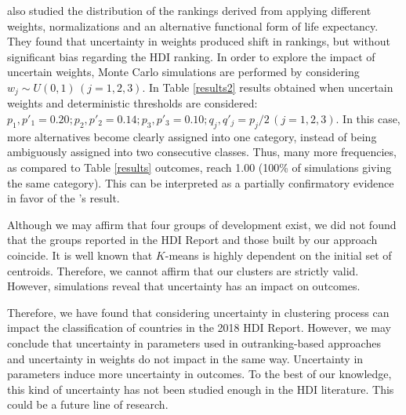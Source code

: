 \documentclass[]{elsarticle}
\theoremstyle{definition}
\begin{document}
\cite{Garcia2010} also studied the distribution of the rankings derived from applying different weights, normalizations and an alternative functional form of life expectancy. They found that uncertainty in weights produced shift in rankings, but without significant bias regarding the HDI ranking.  In order to explore the impact of uncertain weights, Monte Carlo simulations are performed by considering $w_j \sim U(0,1) \, (j=1,2,3)$.  In Table \ref{results2} results obtained when uncertain weights and deterministic thresholds are considered:   $p_1,p'_1 =0.20;  p_2,p'_2 =0.14; p_3,p'_3 = 0.10; q_j,q'_j=p_j/2 \,(j=1,2,3)$.  In this case, more alternatives become clearly assigned into one category, instead of being ambiguously assigned into two consecutive classes. Thus, many more frequencies, as compared to Table \ref{results} outcomes,  reach 1.00 (100\% of simulations giving the same category).   This can be interpreted as a partially confirmatory evidence in favor of the \cite{Garcia2010}'s result.

Although we may affirm that four groups of development exist, we did not found that the groups reported in the HDI Report and those built by our approach coincide. It is well known that $K$-means is highly dependent on the initial set of centroids. Therefore, we cannot affirm that our clusters are strictly valid.  However, simulations reveal that uncertainty has an impact on outcomes. 

Therefore, we have found that considering uncertainty in clustering process can impact the classification of countries in the 2018 HDI Report. However, we may conclude that uncertainty in parameters used in outranking-based approaches and uncertainty in weights do not impact in the same way. Uncertainty in parameters induce more uncertainty in outcomes.  To the best of our knowledge, this kind of uncertainty has not been studied enough in the HDI literature.  This could be a future line of research.
\end{document}
